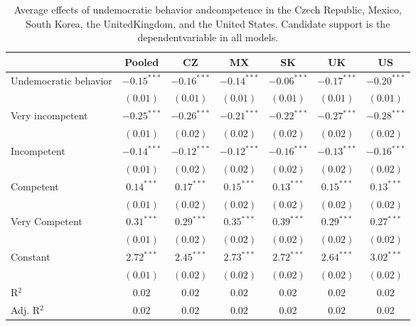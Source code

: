
\begin{table}[!htbp]
\caption{Average effects of undemocratic behavior andcompetence in the Czech Republic, Mexico, South Korea, the UnitedKingdom, and the United States. Candidate support is the dependentvariable in all models.}
\begin{center}
\begin{tabular}{l c c c c c c}
\hline
 & Pooled & CZ & MX & SK & UK & US \\
\hline
Undemocratic behavior & $-0.15^{***}$ & $-0.16^{***}$ & $-0.14^{***}$ & $-0.06^{***}$ & $-0.17^{***}$ & $-0.20^{***}$ \\
                      & $(0.01)$      & $(0.01)$      & $(0.01)$      & $(0.01)$      & $(0.01)$      & $(0.01)$      \\
Very incompetent      & $-0.25^{***}$ & $-0.26^{***}$ & $-0.21^{***}$ & $-0.22^{***}$ & $-0.27^{***}$ & $-0.28^{***}$ \\
                      & $(0.01)$      & $(0.02)$      & $(0.02)$      & $(0.02)$      & $(0.02)$      & $(0.02)$      \\
Incompetent           & $-0.14^{***}$ & $-0.12^{***}$ & $-0.12^{***}$ & $-0.16^{***}$ & $-0.13^{***}$ & $-0.16^{***}$ \\
                      & $(0.01)$      & $(0.02)$      & $(0.02)$      & $(0.02)$      & $(0.02)$      & $(0.02)$      \\
Competent             & $0.14^{***}$  & $0.17^{***}$  & $0.15^{***}$  & $0.13^{***}$  & $0.15^{***}$  & $0.13^{***}$  \\
                      & $(0.01)$      & $(0.02)$      & $(0.02)$      & $(0.02)$      & $(0.02)$      & $(0.02)$      \\
Very Competent        & $0.31^{***}$  & $0.29^{***}$  & $0.35^{***}$  & $0.39^{***}$  & $0.29^{***}$  & $0.27^{***}$  \\
                      & $(0.01)$      & $(0.02)$      & $(0.02)$      & $(0.02)$      & $(0.02)$      & $(0.02)$      \\
Constant              & $2.72^{***}$  & $2.45^{***}$  & $2.73^{***}$  & $2.72^{***}$  & $2.64^{***}$  & $3.02^{***}$  \\
                      & $(0.01)$      & $(0.02)$      & $(0.02)$      & $(0.02)$      & $(0.02)$      & $(0.02)$      \\
\hline
R$^2$                 & $0.02$        & $0.02$        & $0.02$        & $0.02$        & $0.02$        & $0.02$        \\
Adj. R$^2$            & $0.02$        & $0.02$        & $0.02$        & $0.02$        & $0.02$        & $0.02$        \\

\end{tabular}
\end{center}
\end{table}
